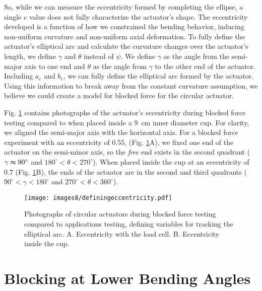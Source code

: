 So, while we can measure the eccentricity formed by completing the ellipse, a single $e$ value does not fully characterize the actuator's shape. The eccentricity developed is a function of how we constrained the bending behavior, inducing non-uniform curvature and non-uniform axial deformation. To fully define the actuator's elliptical arc and calculate the curvature changes over the actuator's length, we define $\gamma$ and $\theta$ instead of $\psi$. We define $\gamma$ as the angle from the semi-major axis to one end and $\theta$ as the angle from $\gamma$ to the other end of the actuator. Including $a_e$ and $b_e$, we can fully define the elliptical arc formed by the actuator. Using this information to break away from the constant curvature assumption, we believe we could create a model for blocked force for the circular actuator. 

Fig. \ref{fig:comparingeccentricity} contains photographs of the actuator's eccentricity during blocked force testing compared to when placed inside a  9~cm inner diameter cup. For clarity, we aligned the semi-major axis with the horizontal axis. For a blocked force experiment with an eccentricity of 0.55, (Fig. \ref{fig:comparingeccentricity}A), we fixed one end of the actuator on the semi-minor axis, so the \emph{free} end exists in the second quadrant ($\gamma\thickapprox90^\circ$ and $180^\circ<\theta<270^\circ$). When placed inside the cup at an eccentricity of 0.7 (Fig. \ref{fig:comparingeccentricity}B), the ends of the actuator are in the second and third quadrants ($90^\circ<\gamma<180^\circ$ and $270^\circ<\theta<360^\circ$). \\

\begin{figure}[!ht]
    \centering
     \texttt{[image: images8/definingeccentricity.pdf]}
    \caption{Photographs of circular actuators during blocked force testing compared to applications testing, defining variables for tracking the elliptical arc. A. Eccentricity with the load cell. B. Eccentricity inside the cup.}
    \label{fig:comparingeccentricity}
\end{figure}

\clearpage
\section{Blocking at Lower Bending Angles}

